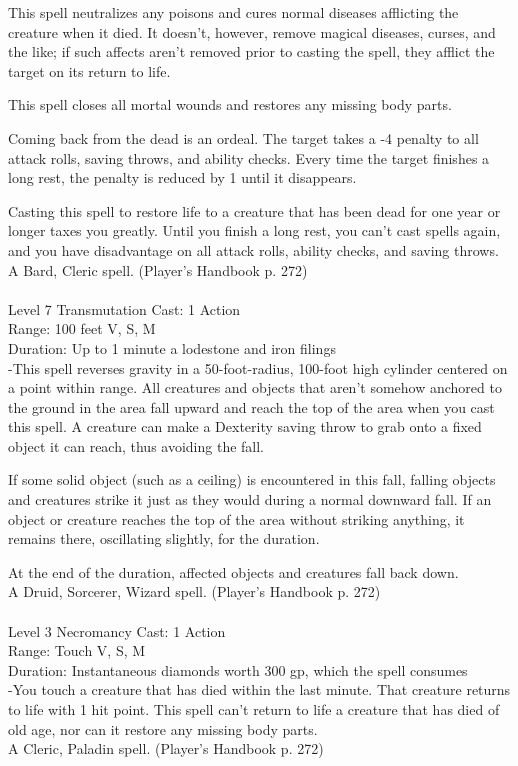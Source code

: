 \documentclass[10pt,twocolumn]{report}
\begin{document}
This spell neutralizes any poisons and cures normal diseases afflicting the creature when it died. It doesn’t, however, remove magical diseases, curses, and the like; if such affects aren’t removed prior to casting the spell, they afflict the target on its return to life.

This spell closes all mortal wounds and restores any missing body parts.

Coming back from the dead is an ordeal. The target takes a -4 penalty to all attack rolls, saving throws, and ability checks. Every time the target finishes a long rest, the penalty is reduced by 1 until it disappears.

Casting this spell to restore life to a creature that has been dead for one year or longer taxes you greatly. Until you finish a long rest, you can’t cast spells again, and you have disadvantage on all attack rolls, ability checks, and saving throws.\\
A Bard, Cleric spell. (Player's Handbook p. 272) \\


 \\
Level 7 \quad Transmutation \quad Cast: 1 Action\\
Range: 100 feet \quad V, S, M\\
Duration: Up to 1 minute \quad a lodestone and iron filings\\
-This spell reverses gravity in a 50-foot-radius, 100-foot high cylinder centered on a point within range.
All creatures and objects that aren’t somehow anchored to the ground in the area fall upward and reach the top of the area when you cast this spell. A creature can make a Dexterity saving throw to grab onto a fixed object it can reach, thus avoiding the fall.

If some solid object (such as a ceiling) is encountered in this fall, falling objects and creatures strike it just as they would during a normal downward fall. If an object or creature reaches the top of the area without striking anything, it remains there, oscillating slightly, for the duration.

At the end of the duration, affected objects and creatures fall back down.\\
A Druid, Sorcerer, Wizard spell. (Player's Handbook p. 272) \\


 \\
Level 3 \quad Necromancy \quad Cast: 1 Action\\
Range: Touch \quad V, S, M\\
Duration: Instantaneous \quad diamonds worth 300 gp, which the spell consumes\\
-You touch a creature that has died within the last minute. That creature returns to life with 1 hit point. This spell can’t return to life a creature that has died of old age, nor can it restore any missing body parts.\\
A Cleric, Paladin spell. (Player's Handbook p. 272) \\
\end{document}
